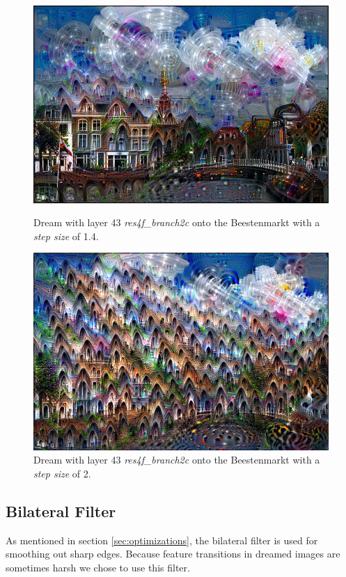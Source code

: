 \begin{figure}[H]
	\centering
	\includegraphics[width=1\linewidth]{img/houses1.jpg}
	\caption{Dream with layer 43 \emph{res4f\_branch2c} onto the Beestenmarkt with a \emph{step size} of 1.4.}
	\label{fig:houses1}
	\endminipage\hfill
	\centering
	\includegraphics[width=1\linewidth]{img/houses2.jpg}
	\caption{Dream with layer 43 \emph{res4f\_branch2c} onto the Beestenmarkt with a \emph{step size} of 2.}
	\label{fig:houses2}
	\endminipage\hfill
\end{figure}

\subsection{Bilateral Filter}
\label{sec:bilateral}

As mentioned in section \ref{sec:optimizations}, the bilateral filter is used for smoothing out sharp edges.
Because feature transitions in dreamed images are sometimes harsh we chose to use this filter.

